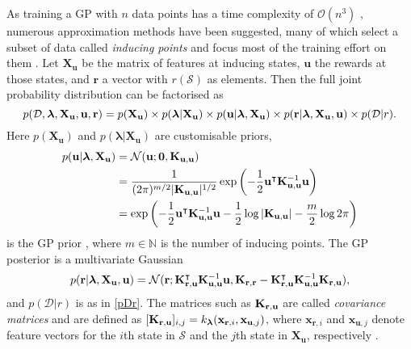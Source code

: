 \documentclass{mprop}
\theoremstyle{definition}
\begin{document}
As training a GP with $n$ data points has a time complexity of
$\mathcal{O}(n^3)$ \cite{DBLP:books/lib/RasmussenW06}, numerous approximation
methods have been suggested, many of which select a subset of data called
\emph{inducing points} and focus most of the training effort on them
\cite{DBLP:journals/corr/abs-1807-01065}. Let $\mathbf{X_u}$ be the matrix of
features at inducing states, $\mathbf{u}$ the rewards at those states, and
$\mathbf{r}$ a vector with $r(\mathcal{S})$ as elements. Then the full joint
probability distribution can be factorised as
\begin{equation} \label{full}
  p(\mathcal{D}, \bm\lambda, \mathbf{X_u}, \mathbf{u}, \mathbf{r}) = p(\mathbf{X_u}) \times p(\bm\lambda | \mathbf{X_u}) \times p(\mathbf{u}
  | \bm\lambda, \mathbf{X_u}) \times p(\mathbf{r} | \bm\lambda, \mathbf{X_u},
  \mathbf{u}) \times p(\mathcal{D} | r).
\end{equation}
Here $p(\mathbf{X_u})$ and $p(\bm\lambda | \mathbf{X_u})$ are customisable priors,
\begin{align}
  p(\mathbf{u} | \bm\lambda, \mathbf{X_u}) &= \mathcal{N}(\mathbf{u}; \mathbf{0}, \mathbf{K}_{\mathbf{u},\mathbf{u}}) \nonumber \\
                                       &= \frac{1}{(2\pi)^{m/2}|\mathbf{K}_{\mathbf{u},\mathbf{u}}|^{1/2}}\exp \left( -\frac{1}{2} \mathbf{u}^\intercal\mathbf{K}_{\mathbf{u},\mathbf{u}}^{-1}\mathbf{u} \right) \nonumber \\
                                       &= \exp\left(-\frac{1}{2}\mathbf{u}^\intercal\mathbf{K}_{\mathbf{u},\mathbf{u}}^{-1}\mathbf{u} - \frac{1}{2}\log|\mathbf{K}_{\mathbf{u},\mathbf{u}}| - \frac{m}{2}\log 2\pi\right) \label{eq:normal}
\end{align}
is the GP prior \cite{DBLP:books/lib/RasmussenW06}, where $m \in \mathbb{N}$ is
the number of inducing points. The GP posterior is a
multivariate Gaussian \cite{DBLP:conf/nips/LevinePK11}
\begin{equation} \label{eq:r}
  p(\mathbf{r} | \bm\lambda, \mathbf{X_u}, \mathbf{u}) =
  \mathcal{N}(\mathbf{r}; \mathbf{K}_{\mathbf{r},\mathbf{u}}^\intercal\mathbf{K}_{\mathbf{u},\mathbf{u}}^{-1}\mathbf{u}, \mathbf{K}_{\mathbf{r},\mathbf{r}} - \mathbf{K}_{\mathbf{r},\mathbf{u}}^\intercal\mathbf{K}_{\mathbf{u},\mathbf{u}}^{-1}\mathbf{K}_{\mathbf{r},\mathbf{u}}),
\end{equation}
and $p(\mathcal{D} | r)$ is as in \eqref{pDr}. The matrices such as
$\mathbf{K}_{\mathbf{r},\mathbf{u}}$ are called \emph{covariance matrices} and are defined as
$[\mathbf{K}_{\mathbf{r},\mathbf{u}}]_{i,j} = k_{\bm\lambda}(\mathbf{x}_{\mathbf{r},i},
\mathbf{x}_{\mathbf{u},j})$, where $\mathbf{x}_{\mathbf{r},i}$ and
$\mathbf{x}_{\mathbf{u},j}$ denote feature vectors for the $i$th state in
$\mathcal{S}$ and the $j$th state in $\mathbf{X_u}$, respectively
\cite{DBLP:conf/uai/JinDAS17}.
\end{document}
